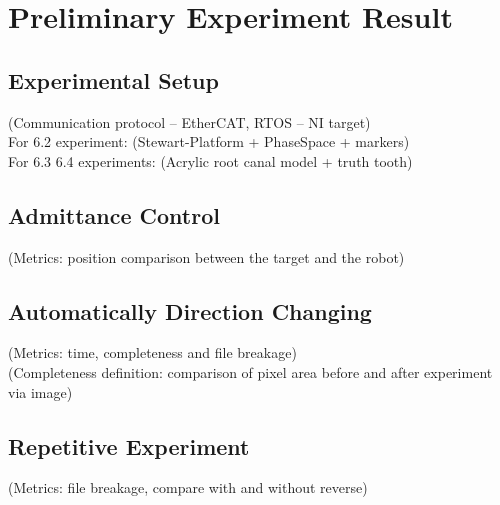 \chapter{Preliminary Experiment Result}
\section{Experimental Setup}
(Communication protocol – EtherCAT, RTOS – NI target)						\\
For 6.2 experiment: (Stewart-Platform + PhaseSpace + markers)				\\
For 6.3 6.4 experiments: (Acrylic root canal model + truth tooth)
\section{Admittance Control}
(Metrics: position comparison between the target and the robot)
\section{Automatically Direction Changing}
(Metrics: time, completeness and file breakage)								\\
(Completeness definition: comparison of pixel area before and after experiment via image)
\section{Repetitive Experiment}
(Metrics: file breakage, compare with and without reverse)